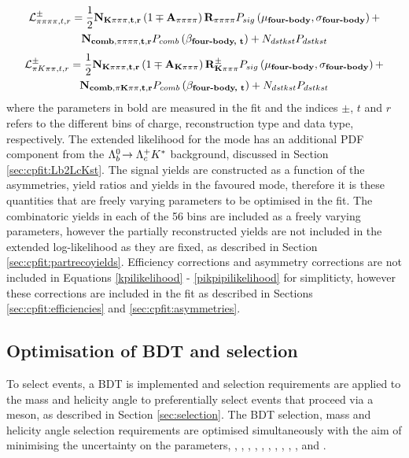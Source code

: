 \begin{multline}
\mathcal{L}_{\pi\pi\pi\pi, t, r}^{\pm} = \frac{1}{2}\mathbf{N_{K\pi\pi\pi, t, r}}\left(1 \mp \mathbf{A_{\pi\pi\pi\pi}}\right)\mathbf{R_{\pi\pi\pi\pi}} P_{sig}\left(\mathbf{\mu_\text{\textbf{four-body}}},\mathbf{\sigma_\text{\textbf{four-body}}}\right) + \\ \mathbf{N_{comb, \pi\pi\pi\pi, t, r}}P_{comb}\left(\mathbf{\beta_\text{\textbf{four-body, t}}}\right) + N_{dstkst}P_{dstkst}
\end{multline}
\begin{multline}
\mathcal{L}_{\pi K\pi\pi, t, r}^{\pm} = \frac{1}{2}\mathbf{N_{K\pi\pi\pi, t, r}}\left(1 \mp \mathbf{A_{K\pi\pi\pi}}\right)\mathbf{R_{K\pi\pi\pi}^{\pm}} P_{sig}\left(\mathbf{\mu_\text{\textbf{four-body}}},\mathbf{\sigma_\text{\textbf{four-body}}}\right) + \\ \mathbf{N_{comb, \pi K\pi\pi, t, r}}P_{comb}\left(\mathbf{\beta_\text{\textbf{four-body, t}}}\right) + N_{dstkst}P_{dstkst}
\label{pikpipilikelihood}
\end{multline}
where the parameters in bold are measured in the fit and the indices $\pm$, $t$ and $r$ refers to the different bins of \B charge, \KS reconstruction type and data type, respectively. The extended likelihood for the \kk mode has an additional PDF component from the ${{\Lambda}^0_{b}}\!\rightarrow {\ensuremath{{\Lambda}^+_{c}}}{\ensuremath{{K}^*}}$ background, discussed in Section \ref{sec:cpfit:Lb2LcKst}. The signal yields are constructed as a function of the asymmetries, yield ratios and yields in the favoured mode, therefore it is these quantities that are freely varying parameters to be optimised in the \CP fit. The combinatoric yields in each of the 56 bins are included as a freely varying parameters, however the partially reconstructed yields are not included in the extended log-likelihood as they are fixed, as described in Section \ref{sec:cpfit:partrecoyields}. Efficiency corrections and asymmetry corrections are not included in Equations \ref{kpilikelihood} - \ref{pikpipilikelihood} for simpliticty, however these corrections are included in the \CP fit as described in Sections \ref{sec:cpfit:efficiencies} and \ref{sec:cpfit:asymmetries}.

\subsection{Optimisation of BDT and \Kstar selection}
\label{sec:cpfit:optimisation}

To select \btodkst events, a BDT is implemented and selection requirements are applied to the \Kstar mass and \KS helicity angle to preferentially select events that proceed via a \Kstar meson, as described in Section \ref{sec:selection}. The BDT selection, \Kstar mass and \KS helicity angle selection requirements are optimised simultaneously with the aim of minimising the uncertainty on the \CP parameters, \Akpi, \Akk, \Apipi, \Rkk, \Rpipi, \Rptwo, \Rmtwo, \Akpipipi, \Apipipipi, \Rpipipipi, \Rpfour and \Rmfour. 

